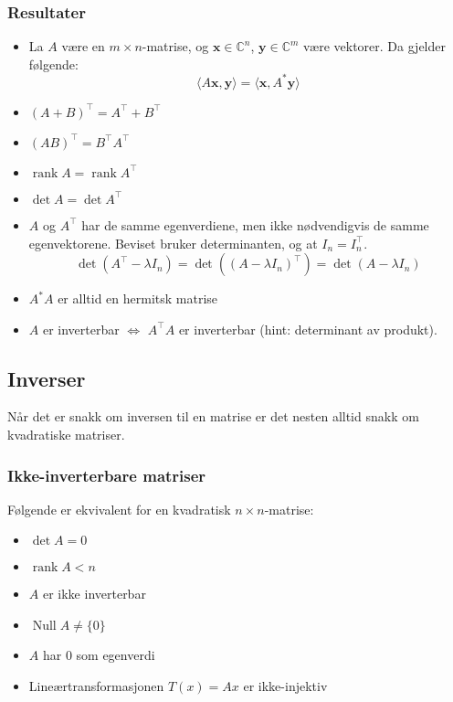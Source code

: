 \documentclass[12pt,a4paper,norsk]{article}
\newcommand{\C}{\mathbb{C}}
\newcommand{\inner}[1]{\langle#1\rangle}
\DeclareMathOperator{\Null}{Null}
\DeclareMathOperator{\rank}{rank}
\newcommand{\vx}{\textbf{x}}
\newcommand{\vy}{\textbf{y}}
\begin{document}
\subsubsection{Resultater}
\begin{itemize}
  \item La $A$ være en $m \times n$-matrise, og $\vx \in \C^{n}$, $\vy \in \C^{m}$ være vektorer.
    Da gjelder følgende:
    \[\inner{A\vx,\vy} = \inner{\vx,A^{*}\vy}\]
  \item ${(A+B)}^{\top} = A^{\top} + B^{\top}$
  \item ${(AB)}^{\top} = B^{\top}A^{\top}$
  \item $\rank A = \rank A^{\top}$
  \item $\det A = \det A^{\top}$
  \item $A$ og $A^{\top}$ har de samme egenverdiene, men ikke
    nødvendigvis de samme egenvektorene. Beviset bruker determinanten, og at
    $I_{n} = I_{n}^{\top}$.
    \[\det(A^{\top}-\lambda I_{n}) = \det({(A-\lambda I_{n})}^{\top}) = \det(A-\lambda I_{n})\]
  \item $A^{*}A$ er alltid en hermitsk matrise
  \item $A$ er inverterbar $\iff$ $A^{\top}A$ er inverterbar (hint: determinant av produkt).
\end{itemize}

\subsection{Inverser}
Når det er snakk om inversen til en matrise er det nesten alltid snakk om
kvadratiske matriser.

\subsubsection{Ikke-inverterbare matriser}\label{sec:ikke-inverterbare_matriser}
Følgende er ekvivalent for en kvadratisk $n \times n$-matrise:
\begin{itemize}
  \item $\det A = 0$
  \item $\rank A < n$
  \item $A$ er ikke inverterbar
  \item $\Null A \neq \{0\}$
  \item $A$ har $0$ som egenverdi
  \item Lineærtransformasjonen $T(x) = Ax$ er ikke-injektiv
\end{itemize}
\end{document}
